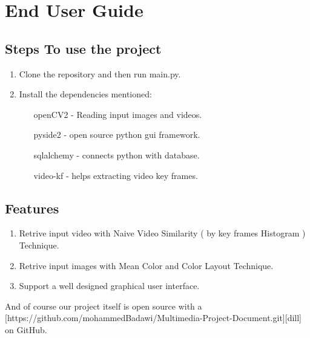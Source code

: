 \chapter{End User Guide}

\section{Steps To use the project}
\begin{enumerate}
    \item Clone the repository and then run main.py.
    \item Install the dependencies mentioned:
    \begin{itemize}
        \item [openCV2] - Reading input images and videos.
        \item [pyside2] - open source python gui framework.
        \item [sqlalchemy] - connects python with database.
        \item [video-kf] - helps extracting video key frames.
    \end{itemize}
\end{enumerate}

\section{Features}
\begin{enumerate}
    \item Retrive input video with Naive Video Similarity ( by key frames Histogram ) Technique.
    \item Retrive input images with Mean Color and Color Layout Technique.
    \item Support a well designed graphical user interface.
\end{enumerate}

And of course our project itself is open source with a [https://github.com/mohammedBadawi/Multimedia-Project-Document.git][dill] on GitHub.